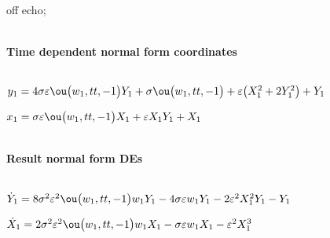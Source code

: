 \documentclass[11pt,a5paper]{article}
\begin{document}


off echo;


\(\)
\paragraph{Time dependent normal form coordinates}
\(
\)\par

\(y_{1}=4 \sigma  \eps \ou\big(w_{1},tt,-1\big) Y_{1}+\sigma  \ou\big(w_{1
},tt,-1\big)+\eps \big(X_{1}^{2}+2 Y_{1}^{2}\big)+Y_{1}
\)\par

\(x_{1}=\sigma  \eps \ou\big(w_{1},tt,-1\big) X_{1}+\eps X_{1} Y_{1}+X_{1}
\)\par

\(\)
\paragraph{Result normal form DEs}
\(
\)\par

\(\dot Y_{1}=8 \sigma ^{2} \eps^{2} \ou\big(w_{1},tt,-1\big) w_{1} Y_{1}-4
 \sigma  \eps w_{1} Y_{1}-2 \eps^{2} X_{1}^{2} Y_{1}-Y_{1}
\)\par

\(\dot X_{1}=2 \sigma ^{2} \eps^{2} \ou\big(w_{1},tt,-1\big) w_{1} X_{1}-
\sigma  \eps w_{1} X_{1}-\eps^{2} X_{1}^{3}
\)\par
\end{document}
